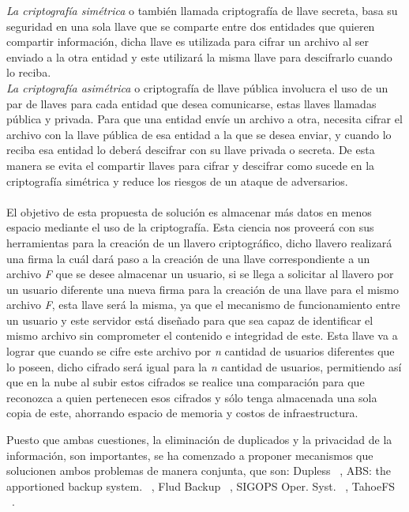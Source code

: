 \textit{La criptografía simétrica} o también llamada criptografía de llave secreta, basa su seguridad en una sola llave que se comparte entre dos entidades que quieren compartir información, dicha llave es utilizada para cifrar un archivo al ser enviado a la otra entidad y este utilizará la misma llave para descifrarlo cuando lo reciba. \\
\textit{La criptografía asimétrica} o criptografía de llave pública involucra el uso de un par de llaves para cada entidad que desea comunicarse, estas llaves llamadas pública y privada. Para que una entidad envíe un archivo a otra, necesita cifrar el archivo con la llave pública de esa entidad a la que se desea enviar, y cuando lo reciba esa entidad lo deberá descifrar con su llave privada o secreta. De esta manera se evita el compartir llaves para cifrar y descifrar como sucede en la criptografía simétrica y reduce los riesgos de un ataque de adversarios.  \\ \\


El objetivo de esta propuesta de solución es almacenar más datos en menos espacio mediante el uso de la criptografía. Esta ciencia nos proveerá con sus herramientas para la creación de un llavero criptográfico, dicho llavero realizará una firma la cuál dará paso a la creación de una llave correspondiente a un archivo \textit{F} que se desee almacenar un usuario, si se llega a solicitar al llavero por un usuario diferente una nueva firma para la creación de una llave para el mismo archivo \textit{F}, esta llave será la misma, ya que el mecanismo de funcionamiento entre un usuario y este servidor está diseñado para que sea capaz de identificar el mismo archivo sin comprometer el contenido e integridad de este. Esta  llave va a lograr que cuando se cifre este archivo por \textit{n} cantidad de usuarios diferentes que lo poseen, dicho cifrado será igual para la \textit{n} cantidad de usuarios, permitiendo así que en la nube al subir estos cifrados se realice una comparación para que reconozca a quien pertenecen esos cifrados y sólo tenga almacenada una sola copia de este, ahorrando espacio de memoria y costos de infraestructura. 

Puesto que ambas cuestiones, la eliminación de duplicados y la privacidad de la información, son importantes, se ha comenzado a
proponer mecanismos que solucionen ambos problemas de manera conjunta, que son: Dupless ~\cite{Bellare}, ABS: the apportioned backup
system. ~\cite{abs}, Flud Backup ~\cite{flud}, SIGOPS Oper. Syst. ~\cite{sigops}, TahoeFS ~\cite{tahoe}.



